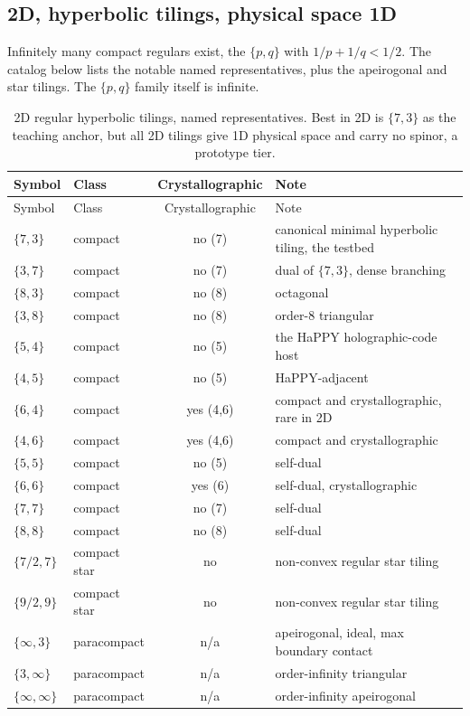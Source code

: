\subsection{2D, hyperbolic tilings, physical space 1D}

Infinitely many compact regulars exist, the $\{p,q\}$ with $1/p + 1/q < 1/2$. The catalog below lists the notable
named representatives, plus the apeirogonal and star tilings. The $\{p,q\}$ family itself is infinite.

{\small
\begin{longtable}{l l c p{3.0in}}
\toprule
Symbol & Class & Crystallographic & Note \\
\midrule
\endfirsthead
\toprule
Symbol & Class & Crystallographic & Note \\
\midrule
\endhead
\bottomrule
\endfoot
\bottomrule
\caption{2D regular hyperbolic tilings, named representatives. Best in 2D is $\{7,3\}$ as the teaching anchor, but
all 2D tilings give 1D physical space and carry no spinor, a prototype tier.}
\label{tab:catalog-2d}
\endlastfoot
$\{7,3\}$ & compact & no (7) & canonical minimal hyperbolic tiling, the testbed \\
$\{3,7\}$ & compact & no (7) & dual of $\{7,3\}$, dense branching \\
$\{8,3\}$ & compact & no (8) & octagonal \\
$\{3,8\}$ & compact & no (8) & order-8 triangular \\
$\{5,4\}$ & compact & no (5) & the HaPPY holographic-code host \\
$\{4,5\}$ & compact & no (5) & HaPPY-adjacent \\
$\{6,4\}$ & compact & yes (4,6) & compact and crystallographic, rare in 2D \\
$\{4,6\}$ & compact & yes (4,6) & compact and crystallographic \\
$\{5,5\}$ & compact & no (5) & self-dual \\
$\{6,6\}$ & compact & yes (6) & self-dual, crystallographic \\
$\{7,7\}$ & compact & no (7) & self-dual \\
$\{8,8\}$ & compact & no (8) & self-dual \\
$\{7/2,7\}$ & compact star & no & non-convex regular star tiling \\
$\{9/2,9\}$ & compact star & no & non-convex regular star tiling \\
$\{\infty,3\}$ & paracompact & n/a & apeirogonal, ideal, max boundary contact \\
$\{3,\infty\}$ & paracompact & n/a & order-infinity triangular \\
$\{\infty,\infty\}$ & paracompact & n/a & order-infinity apeirogonal \\
\end{longtable}}

